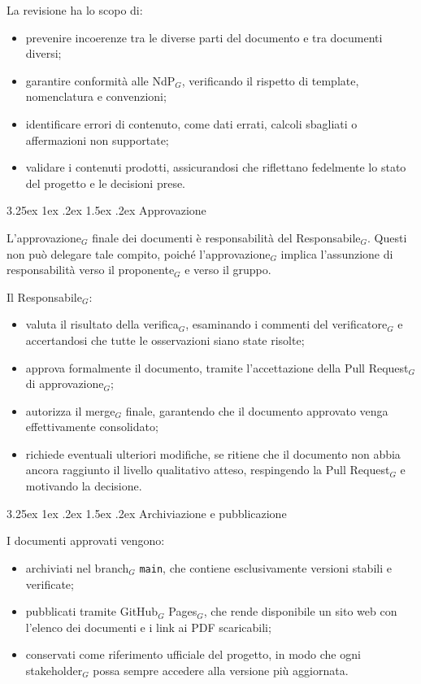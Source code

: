 \documentclass[a4paper, 10pt]{article}
\makeatletter
\renewcommand\paragraph{\@startsection{paragraph}{4}{\z@}%
  {3.25ex \@plus1ex \@minus .2ex}%
  {1.5ex \@plus .2ex}%
  {\normalfont\normalsize\bfseries}}
\makeatother
\begin{document}
La revisione ha lo scopo di:
\begin{itemize}
    \item prevenire incoerenze tra le diverse parti del documento e tra documenti diversi;
    \item garantire conformità alle NdP$_G$, verificando il rispetto di template, nomenclatura e convenzioni;
    \item identificare errori di contenuto, come dati errati, calcoli sbagliati o affermazioni non supportate;
    \item validare i contenuti prodotti, assicurandosi che riflettano fedelmente lo stato del progetto e le decisioni prese.
\end{itemize}

\paragraph{Approvazione}

L'approvazione$_G$ finale dei documenti è responsabilità del Responsabile$_G$. Questi non può delegare tale compito, poiché l'approvazione$_G$ implica l'assunzione di responsabilità verso il proponente$_G$ e verso il gruppo.

Il Responsabile$_G$:
\begin{itemize}
    \item valuta il risultato della verifica$_G$, esaminando i commenti del verificatore$_G$ e accertandosi che tutte le osservazioni siano state risolte;
    \item approva formalmente il documento, tramite l'accettazione della Pull Request$_G$ di approvazione$_G$;
    \item autorizza il merge$_G$ finale, garantendo che il documento approvato venga effettivamente consolidato;
    \item richiede eventuali ulteriori modifiche, se ritiene che il documento non abbia ancora raggiunto il livello qualitativo atteso, respingendo la Pull Request$_G$ e motivando la decisione.
\end{itemize}

\paragraph{Archiviazione e pubblicazione}

I documenti approvati vengono:
\begin{itemize}
    \item archiviati nel branch$_G$ \texttt{main}, che contiene esclusivamente versioni stabili e verificate;
    \item pubblicati tramite GitHub$_G$ Pages$_G$, che rende disponibile un sito web con l'elenco dei documenti e i link ai PDF scaricabili;
    \item conservati come riferimento ufficiale del progetto, in modo che ogni stakeholder$_G$ possa sempre accedere alla versione più aggiornata.
\end{itemize}
\end{document}
